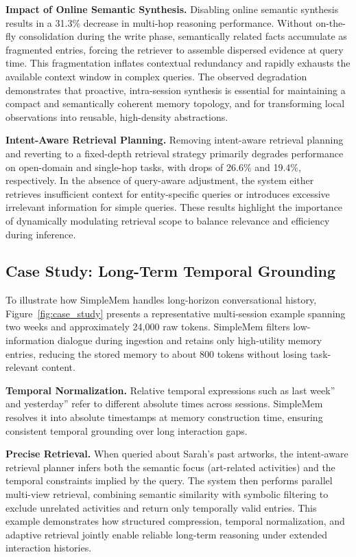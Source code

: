 \documentclass{article}
\newcommand{\ours}{SimpleMem}
\theoremstyle{plain}
\theoremstyle{definition}
\theoremstyle{remark}
\begin{document}
\noindent \textbf{Impact of Online Semantic Synthesis.}
Disabling online semantic synthesis results in a 31.3\% decrease in multi-hop reasoning performance. Without on-the-fly consolidation during the write phase, semantically related facts accumulate as fragmented entries, forcing the retriever to assemble dispersed evidence at query time. This fragmentation inflates contextual redundancy and rapidly exhausts the available context window in complex queries. The observed degradation demonstrates that proactive, intra-session synthesis is essential for maintaining a compact and semantically coherent memory topology, and for transforming local observations into reusable, high-density abstractions.

\noindent \textbf{Intent-Aware Retrieval Planning.}
Removing intent-aware retrieval planning and reverting to a fixed-depth retrieval strategy primarily degrades performance on open-domain and single-hop tasks, with drops of 26.6\% and 19.4\%, respectively.
In the absence of query-aware adjustment, the system either retrieves insufficient context for entity-specific queries or introduces excessive irrelevant information for simple queries.
These results highlight the importance of dynamically modulating retrieval scope to balance relevance and efficiency during inference.

\vspace{-0.3em}
\subsection{Case Study: Long-Term Temporal Grounding}
\vspace{-0.3em}
\label{sec:case_study}
To illustrate how \ours{} handles long-horizon conversational history, Figure~\ref{fig:case_study} presents a representative multi-session example spanning two weeks and approximately 24,000 raw tokens.
\ours{} filters low-information dialogue during ingestion and retains only high-utility memory entries, reducing the stored memory to about 800 tokens without losing task-relevant content.

\noindent \textbf{Temporal Normalization.}
Relative temporal expressions such as last week'' and yesterday'' refer to different absolute times across sessions.
\ours{} resolves it into absolute timestamps at memory construction time, ensuring consistent temporal grounding over long interaction gaps.

\noindent \textbf{Precise Retrieval.}
When queried about Sarah’s past artworks, the intent-aware retrieval planner infers both the semantic focus (art-related activities) and the temporal constraints implied by the query. 
The system then performs parallel multi-view retrieval, combining semantic similarity with symbolic filtering to exclude unrelated activities and return only temporally valid entries.
This example demonstrates how structured compression, temporal normalization, and adaptive retrieval jointly enable reliable long-term reasoning under extended interaction histories.
\end{document}
